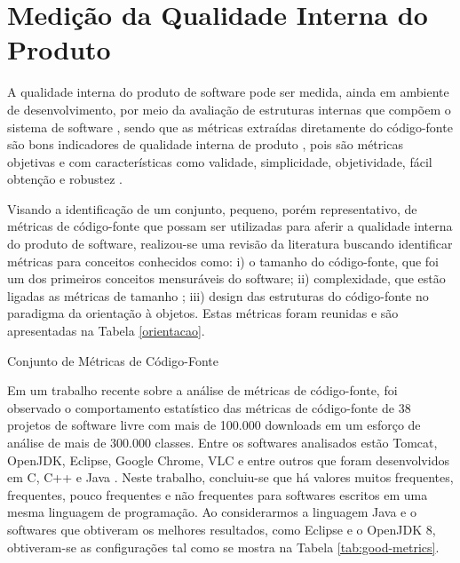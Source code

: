 \section{Medição da Qualidade Interna do Produto}

A qualidade interna do produto de software pode ser medida, ainda em ambiente de desenvolvimento, por meio da avaliação de estruturas internas que compõem o sistema de software \cite{ISO25023}, sendo que as métricas extraídas diretamente do código-fonte são bons indicadores de qualidade interna de produto \cite{beck2003test}, pois são métricas objetivas e com características como validade, simplicidade, objetividade, fácil obtenção e robustez \cite{Mills:1999}.  


Visando a identificação de um conjunto, pequeno, porém representativo, de métricas de código-fonte que possam ser utilizadas para aferir a qualidade interna do produto de software, realizou-se uma revisão da literatura buscando identificar métricas para conceitos conhecidos como: i) o tamanho do código-fonte, que foi um dos primeiros conceitos mensuráveis do software; ii) complexidade, que estão ligadas as métricas de tamanho \cite{Lehman1980b}; iii)  design das estruturas do código-fonte no paradigma da orientação à objetos. Estas métricas foram reunidas e são apresentadas na Tabela \ref{orientacao}.     

	\begin{table}[h]
	\caption{Conjunto de Métricas de Código-Fonte}
	\addtolength{\belowcaptionskip}{6pt}
	\begin{center}
	
	\label{orientacao}
	\end{center}
	\end{table}

Em um trabalho recente sobre a análise de métricas de código-fonte, foi observado o comportamento estatístico das métricas de código-fonte de 38 projetos de software livre com mais de 100.000 downloads em um esforço de análise de mais de 300.000 classes. Entre os softwares analisados estão Tomcat, OpenJDK, Eclipse, Google Chrome, VLC e entre outros que foram desenvolvidos em C, C++ e Java \cite{Meirelles2013}. Neste trabalho, concluiu-se que há valores muitos frequentes, frequentes, pouco frequentes e não frequentes para softwares escritos em uma mesma linguagem de programação. Ao considerarmos a linguagem Java e o softwares que obtiveram os melhores resultados, como Eclipse e o OpenJDK 8, obtiveram-se as configurações tal como se mostra na Tabela \ref{tab:good-metrics}.  


